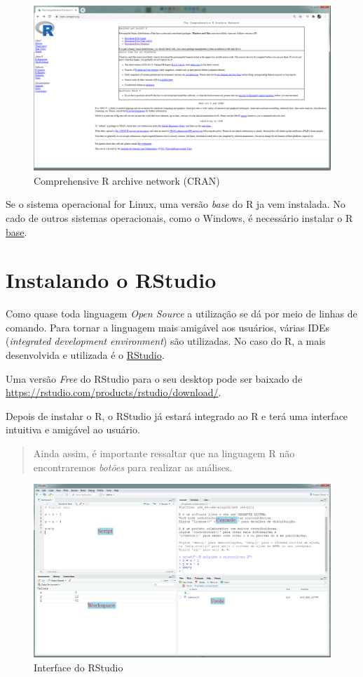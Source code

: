 \documentclass[
]{book}
\theoremstyle{definition}
\theoremstyle{definition}
\theoremstyle{definition}
\theoremstyle{remark}
\begin{document}
\begin{figure}
\includegraphics[width=0.9\linewidth]{Figuras/CRAN} \caption{Comprehensive R archive network (CRAN)}\label{fig:cran}
\end{figure}

Se o sistema operacional for Linux, uma versão \emph{base} do R ja vem instalada. No cado de outros sistemas operacionais, como o Windows, é necessário instalar o R \href{https://cran.r-project.org/bin/windows/base/}{base}.

\hypertarget{instalando-o-rstudio}{%
\section{Instalando o RStudio}\label{instalando-o-rstudio}}

Como quase toda linguagem \emph{Open Source} a utilização se dá por meio de linhas de comando. Para tornar a linguagem mais amigável aos usuários, várias IDEs (\emph{integrated development environment}) são utilizadas. No caso do R, a mais desenvolvida e utilizada é o \href{https://rstudio.com/products/rstudio/}{RStudio}.

Uma versão \emph{Free} do RStudio para o seu desktop pode ser baixado de \url{https://rstudio.com/products/rstudio/download/}.

Depois de instalar o R, o RStudio já estará integrado ao R e terá uma interface intuitiva e amigável ao usuário.

\begin{quote}
Ainda assim, é importante ressaltar que na linguagem R não encontraremos \emph{botões} para realizar as análises.
\end{quote}

\begin{figure}
\includegraphics[width=0.9\linewidth]{Figuras/RStudio} \caption{Interface do RStudio}\label{fig:rstudio}
\end{figure}
\end{document}

